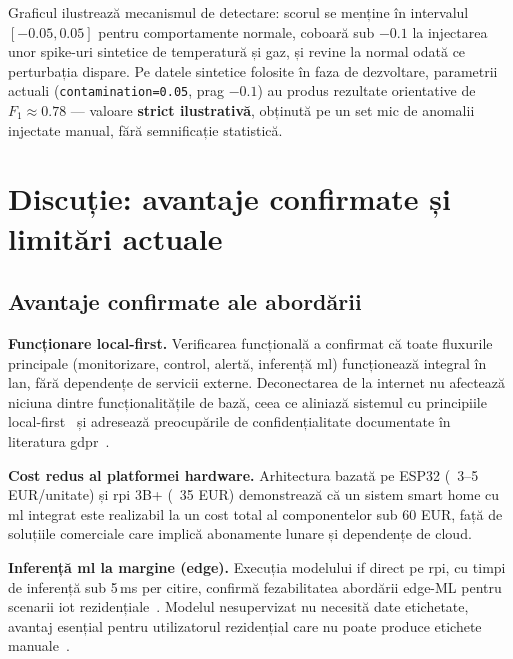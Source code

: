 Graficul ilustrează mecanismul de detectare: scorul se menține în intervalul $[-0.05, 0.05]$
pentru comportamente normale, coboară sub $-0.1$ la injectarea unor spike-uri sintetice de
temperatură și gaz, și revine la normal odată ce perturbația dispare. Pe datele sintetice folosite
în faza de dezvoltare, parametrii actuali (\texttt{contamination=0.05}, prag $-0.1$) au produs
rezultate orientative de $F_1 \approx 0.78$ — valoare \textbf{strict ilustrativă}, obținută
pe un set mic de anomalii injectate manual, fără semnificație statistică.

\section{Discuție: avantaje confirmate și limitări actuale}
\label{sec:discutie}

\subsection{Avantaje confirmate ale abordării}

\textbf{Funcționare local-first.}
Verificarea funcțională a confirmat că toate fluxurile principale (monitorizare, control, alertă,
inferență \gls{ml}) funcționează integral în \gls{lan}, fără dependențe de servicii externe.
Deconectarea de la internet nu afectează niciuna dintre funcționalitățile de bază, ceea ce
aliniază sistemul cu principiile local-first~\cite{kleppmann2019localfirst} și adresează
preocupările de confidențialitate documentate în literatura \gls{gdpr}~\cite{zheng2018smarthomeprivacy,gdpr2016}.

\textbf{Cost redus al platformei hardware.}
Arhitectura bazată pe ESP32 (~3–5 EUR/unitate) și \gls{rpi} 3B+ (~35 EUR) demonstrează că
un sistem smart home cu \gls{ml} integrat este realizabil la un cost total al componentelor
sub 60 EUR, față de soluțiile comerciale care implică abonamente lunare și dependențe de cloud.

\textbf{Inferență \gls{ml} la margine (edge).}
Execuția modelului \gls{if} direct pe \gls{rpi}, cu timpi de inferență sub 5\,ms per citire,
confirmă fezabilitatea abordării edge-ML pentru scenarii \gls{iot} rezidențiale~\cite{shi2016edge,premsankar2018edgeiot}.
Modelul nesupervizat nu necesită date etichetate, avantaj esențial pentru utilizatorul rezidențial
care nu poate produce etichete manuale~\cite{chandola2009anomaly,cook2020anomalyiot}.

